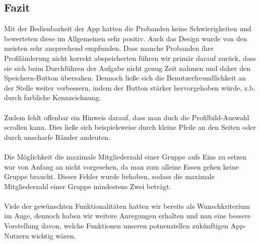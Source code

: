 \documentclass[a4paper]{scrreprt}
\begin{document}
\subsection*{Fazit}
Mit der Bedienbarkeit der App hatten die Probanden keine Schwierigkeiten und bewerteten diese im Allgemeinen sehr positiv. Auch das Design wurde von den meisten sehr ansprechend empfunden. Dass manche Probanden ihre Profiländerung nicht korrekt abspeicherten führen wir primär darauf zurück, dass sie sich beim Durchführen der Aufgabe nicht genug Zeit nahmen und daher den Speichern-Button übersahen. Dennoch ließe sich die Benutzerfreundlichkeit an der Stelle weiter verbessern, indem der Button stärker hervorgehoben würde, z.b. durch farbliche Kennzeichnung. \\
\ \\
Zudem fehlt offenbar ein Hinweis darauf, dass man duch die Profilbild-Auswahl scrollen kann. Dies ließe sich beispielsweise durch kleine Pfeile an den Seiten oder durch unscharfe Ränder andeuten.  \\
\ \\
Die Möglichkeit die maximale Mitgliederzahl einer Gruppe aufs Eins zu setzen war von Anfang an nicht vorgesehen, da man zum alleine Essen gehen keine Gruppe braucht. Dieser Fehler wurde behoben, sodass die maximale Mitgliederzahl einer Gruppe mindestens Zwei beträgt.\\ 
\ \\
Viele der gewünschten Funktionalitäten hatten wir bereits als Wunschkriterium im Auge, dennoch haben wir weitere Anregungen erhalten und nun eine bessere Vorstellung davon, welche Funktionen unseren potnenziellen zukünftigen App-Nutzern wichtig wären.

\printglossaries
\end{document}
